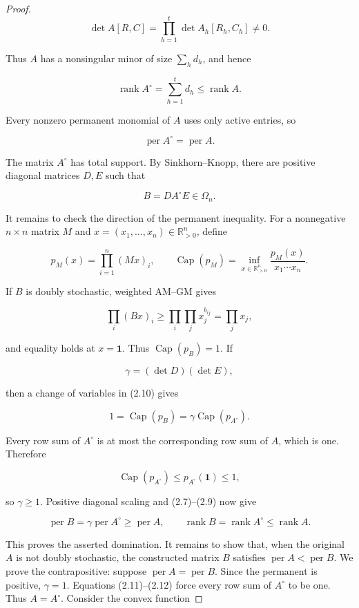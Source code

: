 \documentclass[11pt]{article}
\theoremstyle{remark}
\begin{document}
\begin{proof}
\[
 \det A[R,C]=\prod_{h=1}^t\det A_h[R_h,C_h]\ne0.
\]

Thus \(A\) has a nonsingular minor of size \(\sum_h d_h\), and hence

\[
 \operatorname{rank}A^\circ=\sum_{h=1}^t d_h
 \leq\operatorname{rank}A.                                 \tag{2.7}
\]

Every nonzero permanent monomial of \(A\) uses only active entries, so

\[
 \operatorname{per}A^\circ=\operatorname{per}A.            \tag{2.8}
\]

The matrix \(A^\circ\) has total support. By Sinkhorn--Knopp, there are
positive diagonal matrices \(D,E\) such that

\[
 B=DA^\circ E\in\Omega_n.                                  \tag{2.9}
\]

It remains to check the direction of the permanent inequality. For a
nonnegative \(n\times n\) matrix \(M\) and
\(x=(x_1,\ldots,x_n)\in\mathbb R_{>0}^n\), define

\[
 p_M(x)=\prod_{i=1}^n(Mx)_i,
 \qquad
 \operatorname{Cap}(p_M)
 =\inf_{x\in\mathbb R_{>0}^n}
   \frac{p_M(x)}{x_1\cdots x_n}.                         \tag{2.10}
\]

If \(B\) is doubly stochastic, weighted AM--GM gives

\[
 \prod_i(Bx)_i
 \geq\prod_i\prod_jx_j^{b_{ij}}
 =\prod_jx_j,
\]

and equality holds at \(x=\mathbf1\). Thus
\(\operatorname{Cap}(p_B)=1\). If

\[
 \gamma=(\det D)(\det E),
\]

then a change of variables in (2.10) gives

\[
 1=\operatorname{Cap}(p_B)
 =\gamma\operatorname{Cap}(p_{A^\circ}).                  \tag{2.11}
\]

Every row sum of \(A^\circ\) is at most the corresponding row sum of \(A\),
which is one. Therefore

\[
 \operatorname{Cap}(p_{A^\circ})
 \leq p_{A^\circ}(\mathbf1)\leq1,                         \tag{2.12}
\]

so \(\gamma\geq1\). Positive diagonal scaling and (2.7)--(2.9) now give

\[
 \operatorname{per}B
 =\gamma\operatorname{per}A^\circ
 \geq\operatorname{per}A,
 \qquad
 \operatorname{rank}B=\operatorname{rank}A^\circ
 \leq\operatorname{rank}A.                                \tag{2.13}
\]

This proves the asserted domination. It remains to show that, when the
original \(A\) is not doubly stochastic, the constructed matrix \(B\)
satisfies \(\operatorname{per}A<\operatorname{per}B\). We prove the
contrapositive: suppose \(\operatorname{per}A=\operatorname{per}B\). Since
the permanent is positive, \(\gamma=1\). Equations (2.11)--(2.12) force
every row sum of \(A^\circ\)
to be one. Thus \(A=A^\circ\). Consider the convex function


\end{proof}
\end{document}
